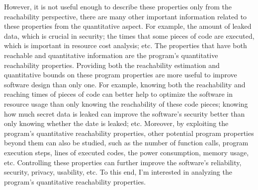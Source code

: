 However, it is not useful enough to describe these properties only
from the reachability perspective,
there are many other
important information related to these properties from the quantitative aspect.
For example, the amount of leaked data, which is crucial in security;
the times that some pieces of code are executed, which is important in resource cost analysis; etc.
The properties that have both reachable and quantitative information are
the program's quantitative reachability properties.
 Providing both the reachability estimation and quantitative bounds on 
these program properties are more useful to improve software design
 than only one.
For example, knowing both the reachability and reaching times of pieces of code
can better help to optimize the software in resource usage than only knowing the reachability of these code pieces;
knowing
how much secret data is leaked can
improve the software's security better than only knowing whether the date is leaked; etc.
Moreover, 
by exploiting the program's quantitative reachability properties,
other potential program properties beyond them can also be 
studied,
such as the number of function calls,
program execution steps,
lines of executed codes,
the power consumption, memory usage, etc. 
 Controlling
these properties
can further improve the software's reliability, security, privacy, usability, etc.
To this end, I'm interested in
analyzing the program's quantitative reachability properties.

